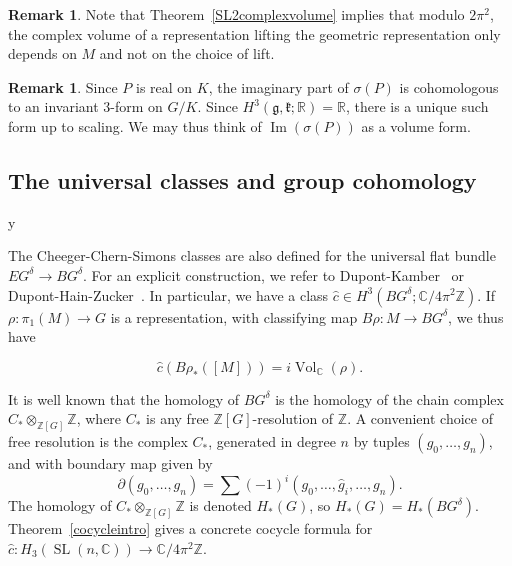 \documentclass[11pt]{amsart}
\theoremstyle{definition}
\newtheorem{remark}[theorem]{Remark}
\numberwithin{equation}{section}
\def\printname#1{
        \if\draft y
                \smash{\makebox[0pt]{\hspace{-0.5in}
                        \raisebox{8pt}{\tt\tiny #1}}}
        \fi
}
\def\lbl#1{\label{#1}\printname{#1}}
\DeclareMathOperator{\Vol}{Vol}
\DeclareMathOperator{\Imag}{Im}
\DeclareMathOperator{\SL}{SL}
\newcommand{\R}{\mathbb R}
\newcommand{\C}{\mathbb C}
\newcommand{\Z}{\mathbb Z}
\begin{document}
\begin{remark} 
Note that Theorem~\ref{SL2complexvolume} implies that modulo $2\pi^2$, the complex volume of a representation lifting the geometric representation only depends on $M$ and not on the choice of lift.
\end{remark}

\begin{remark} 
Since $P$ is real on $K$, the imaginary part of $\sigma(P)$ is cohomologous to an invariant $3$-form on $G/K$. Since $H^3(\mathfrak g,\mathfrak k;\R)=\R$, there is a unique such form up to scaling. We may thus think of $\Imag(\sigma(P))$ as a volume form. 
\end{remark}


\subsection{The universal classes and group cohomology}
\lbl{sub.universal}

The Cheeger-Chern-Simons classes are also defined for the universal flat bundle $EG^\delta\to BG^\delta$. For an explicit construction, we refer to Dupont-Kamber~\cite{DupontKamber} or Dupont-Hain-Zucker~\cite{DupontHainZucker}.
In particular, we have a class $\widehat c\in H^3(BG^\delta;\C/4\pi^2\Z)$. 
If $\rho\colon \pi_1(M)\to G$ is a representation, with classifying map $B\rho\colon M\to BG^\delta$, we thus have

\begin{equation}
\widehat c(B\rho_*([M]))=i\Vol_\C(\rho).
\end{equation}

It is well known that the homology of $BG^\delta$ is the homology of the chain complex $C_*\otimes_{\Z[G]}\Z$, where $C_*$ is any free $\Z[G]$-resolution of $\Z$. A convenient choice of free resolution is the complex $C_*$, generated in degree $n$ by tuples $(g_0,\dots, g_n)$, and with boundary map given by 
\begin{equation}
\partial (g_0,\dots,g_n)=\sum (-1)^i (g_0,\dots,\widehat g_i,\dots,g_n).
\end{equation} 
The homology of $C_*\otimes_{\Z[G]}\Z$ is denoted $H_*(G)$, so $H_*(G)=H_*(BG^\delta)$. Theorem~\ref{cocycleintro} gives a concrete cocycle formula for $\widehat c\colon H_3(\SL(n,\C))\to \C/4\pi^2\Z$.
\end{document}
